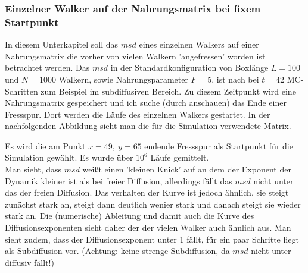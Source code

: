\documentclass[a4paper, 12pt]{scrartcl}
\begin{document}
\newpage

\subsubsection{Einzelner Walker auf der Nahrungsmatrix bei fixem Startpunkt}

In diesem Unterkapitel soll das $msd$ eines einzelnen Walkers auf einer Nahrungsmatrix die vorher von vielen Walkern 'angefressen' worden ist betrachtet werden. 
Das $msd$ in der Standardkonfiguration von Boxlänge $L=100$ und $N=1000$ Walkern, sowie Nahrungsparameter $F=5$, ist nach bei $t=42$ MC-Schritten zum Beispiel im subdiffusiven Bereich. Zu diesem Zeitpunkt wird eine Nahrungsmatrix gespeichert und ich suche (durch anschauen) das Ende einer Fressspur. Dort werden die Läufe des einzelnen Walkers gestartet. 
In der nachfolgenden Abbildung sieht man die für die Simulation verwendete Matrix.



\noindent Es wird die am Punkt $x=49,\ y=65$ endende Fressspur als Startpunkt für die Simulation gewählt. Es wurde über $10^6$ Läufe gemittelt.
\\
Man sieht, dass $msd$ weißt einen 'kleinen Knick' auf an dem der Exponent der Dynamik kleiner ist als bei freier Diffusion, allerdings fällt das $msd$ nicht unter das der freien Diffusion. Das verhalten der Kurve ist jedoch ähnlich, sie steigt zunächst stark an, steigt dann deutlich wenier stark und danach steigt sie wieder stark an. Die (numerische) Ableitung und damit auch die Kurve des Diffusionsexponenten sieht daher der der vielen Walker auch ähnlich aus. Man sieht zudem, dass der Diffusionsexponent unter 1 fällt, für ein paar Schritte liegt als Subdiffusion vor. (Achtung: keine strenge Subdiffusion, da $msd$ nicht unter diffusiv fällt!)
\end{document}
